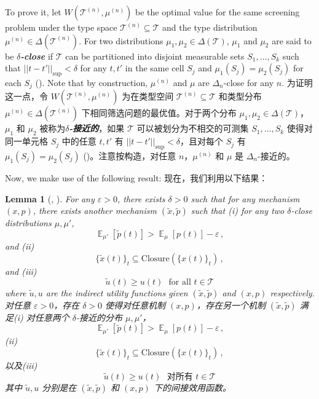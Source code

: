 \documentclass[12pt,letterpaper]{article}
\newenvironment{original}{\color{black}\noindent}{}
\newenvironment{translation}{\color{blue}\noindent}{}
\theoremstyle{plain}
\newtheorem{lemma}{Lemma}
\theoremstyle{definition}
\theoremstyle{remark}
\DeclareMathOperator{\E}{\mathds{E}}
\renewcommand{\1}{\mathds{1}}
\renewcommand{\epsilon}{\varepsilon}
\theoremstyle{definition}
\begin{document}
\begin{original}
To prove it, let $W(\mathcal{T}^{(n)}, \mu^{(n)})$ be the optimal value for the same screening problem under the type space $\mathcal{T}^{(n)} \subseteq \mathcal{T}$ and the type distribution $\mu^{(n)} \in \Delta(\mathcal{T}^{(n)})$. For two distributions $\mu_1, \mu_2 \in \Delta(\mathcal{T})$, $\mu_1$ and $\mu_2$ are said to be \textit{\textbf{$\delta$-close}} if $\mathcal{T}$ can be partitioned into disjoint measurable sets $S_1,\dots, S_k$ such that $||t- t'||_{\sup} < \delta$ for any $t, t'$ in the same cell $S_j$ and $\mu_1(S_j) = \mu_2(S_j)$ for each $S_j$ (\citealt{madarasz2017sellers}). Note that by construction, $\mu^{(n)}$ and $\mu$ are $\Delta_n$-close for any $n$.
\end{original}
\begin{translation}
为证明这一点，令 $W(\mathcal{T}^{(n)}, \mu^{(n)})$ 为在类型空间 $\mathcal{T}^{(n)} \subseteq \mathcal{T}$ 和类型分布 $\mu^{(n)} \in \Delta(\mathcal{T}^{(n)})$ 下相同筛选问题的最优值。对于两个分布 $\mu_1, \mu_2 \in \Delta(\mathcal{T})$，$\mu_1$ 和 $\mu_2$ 被称为\textit{\textbf{$\delta$-接近的}}，如果 $\mathcal{T}$ 可以被划分为不相交的可测集 $S_1,\dots, S_k$ 使得对同一单元格 $S_j$ 中的任意 $t, t'$ 有 $||t- t'||_{\sup} < \delta$，且对每个 $S_j$ 有 $\mu_1(S_j) = \mu_2(S_j)$ (\citealt{madarasz2017sellers})。注意按构造，对任意 $n$，$\mu^{(n)}$ 和 $\mu$ 是 $\Delta_n$-接近的。
\end{translation}

\begin{original}
Now, we make use of the following result:
\end{original}
\begin{translation}
现在，我们利用以下结果：
\end{translation}

\begin{lemma}[\citealt{madarasz2017sellers}, \citealt{Carroll2017}]\label{lem:local}
\begin{original}
For any $\epsilon >0$, there exists $\delta > 0$ such that for any mechanism $(x, p)$, there exists another mechanism $(\tilde{x}, \tilde{p})$ such that \textit{(i)} for any two $\delta$-close distributions $\mu, \mu'$,
\[\E_{\mu'}[\tilde{p}(t)] > \E_{\mu}[p(t)] -\epsilon\,,\]
and \textit{(ii)}
\[ \{\tilde{x}(t)\}_{t} \subseteq \text{Closure}(\{x(t)\}_{t})\,,\]
and  \textit{(iii)}
\[\tilde{u}(t) \geq u(t) \,\,\text{ for all $t \in \mathcal{T}$}\]
where $\tilde{u}, u$ are the indirect utility functions given $(\tilde{x}, \tilde{p})$ and $(x, p)$ respectively.
\end{original}
\begin{translation}
对任意 $\epsilon >0$，存在 $\delta > 0$ 使得对任意机制 $(x, p)$，存在另一个机制 $(\tilde{x}, \tilde{p})$ 满足\textit{(i)} 对任意两个 $\delta$-接近的分布 $\mu, \mu'$，
\[\E_{\mu'}[\tilde{p}(t)] > \E_{\mu}[p(t)] -\epsilon\,,\]
\textit{(ii)}
\[ \{\tilde{x}(t)\}_{t} \subseteq \text{Closure}(\{x(t)\}_{t})\,,\]
以及\textit{(iii)}
\[\tilde{u}(t) \geq u(t) \,\,\text{ 对所有 $t \in \mathcal{T}$}\]
其中 $\tilde{u}, u$ 分别是在 $(\tilde{x}, \tilde{p})$ 和 $(x, p)$ 下的间接效用函数。
\end{translation}
\end{lemma}
\end{document}
